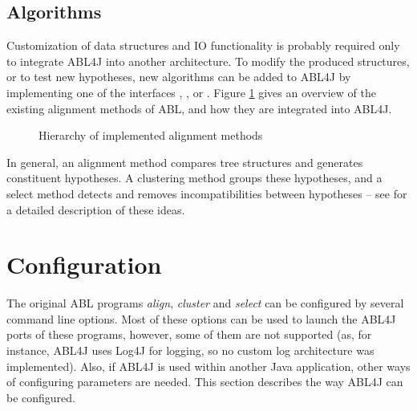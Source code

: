 \documentclass[12pt,a4paper]{article}
\newcommand{\code}[1]{{\ttfamily\selectfont{#1}}}
\begin{document}
\subsection{Algorithms}
Customization of data structures and IO functionality is probably
required only to integrate ABL4J into another architecture. To modify the
produced structures, or to test new hypotheses, new algorithms can be added to
ABL4J by implementing one of the interfaces \code{AlignmentMethod},
\code{ClusterMethod}, or \code{SelectMethod}. Figure \ref{align_methods} gives
an overview of the existing alignment methods of ABL, and how they are
integrated into ABL4J.


\begin{figure}
  \centering
  \caption{Hierarchy of implemented alignment methods}
  \label{align_methods} 
\end{figure} 

In general, an alignment method compares tree structures and generates
constituent hypotheses. A clustering method groups these hypotheses, and a
select method detects and removes incompatibilities between hypotheses -- see
\cite{vanZaanen:2003p72} for a detailed description of these ideas.

\section{Configuration}\label{configuration}
The original ABL programs \emph{align}, \emph{cluster} and \emph{select} can be
configured by several command line options. Most of these options can be used to
launch the ABL4J ports of these programs, however, some of them are not
supported (as, for instance, ABL4J uses Log4J for logging, so no custom log
architecture was implemented). Also, if ABL4J is used within another Java
application, other ways of configuring parameters are needed. This section
describes the way ABL4J can be configured.
\end{document}
